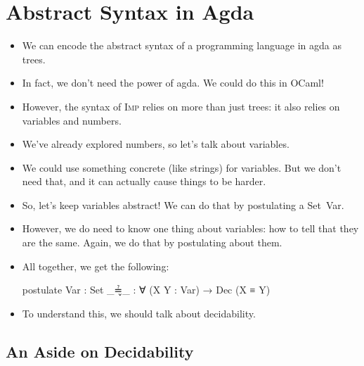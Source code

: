 \documentclass{lecturenotes}
\newcommand{\Imp}{\textsc{Imp}\xspace}
\begin{document}
\section{Abstract Syntax in Agda}
\label{sec:abstract-syntax-agda}

\begin{itemize}
\item We can encode the abstract syntax of a programming language in agda as trees.
\item In fact, we don't need the power of agda.
We could do this in OCaml!
\item However, the syntax of \Imp relies on more than just trees: it also relies on variables and numbers.
\item We've already explored numbers, so let's talk about variables.
\item We could use something concrete (like strings) for variables.
  But we don't need that, and it can actually cause things to be harder.
\item So, let's keep variables abstract!
  We can do that by \textsf{postulat}ing a \textsf{Set}~\textsf{Var}.
\item However, we do need to know one thing about variables: how to tell that they are the same.
  Again, we do that by \textsf{postulat}ing about them.
\item All together, we get the following:
\begin{code}
postulate
  Var : Set
  _≟̬_ : ∀ (X Y : Var) → Dec (X ≡ Y)
\end{code}
\item To understand this, we should talk about decidability.
\end{itemize}

\subsection{An Aside on Decidability}
\label{sec:an-aside-decid}
\end{document}

